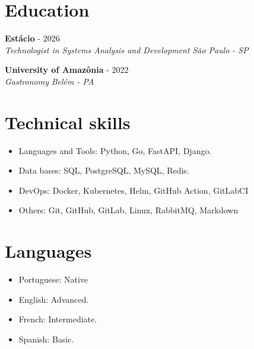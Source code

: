\documentclass[a4paper,10pt]{article}
\newcommand{\entry}[4]{
  \noindent\textbf{#1} \hfill #2 \\
  \noindent\textit{#3} \hfill \textit{#4} \\
  \vspace{2pt}
}
\begin{document}

\section*{Education}
\vspace{0.6em}

\entry{Estácio}{\faCalendar {} - 2026}{Technologist in Systems Analysis and Development}{\faMapMarker \space São Paulo - SP}

\entry{University of Amazônia}{\faCalendar {} - 2022}{Gastronomy}{\faMapMarker \space Belém - PA}


\section*{Technical skills}
\vspace{0.6em}
\begin{itemize}
\setlength\itemsep{0em}
\item Languages and Tools: Python, Go, FastAPI, Django.
\item Data bases: SQL, PostgreSQL, MySQL, Redis.
\item DevOps: Docker, Kubernetes, Helm, GitHub Action, GitLabCI
\item Others: Git, GitHub, GitLab, Linux, RabbitMQ, Markdown
\end{itemize}

\section*{Languages}
\vspace{0.6em}
\begin{itemize}
\setlength\itemsep{0em}
\item Portuguese: Native
\item English: Advanced.
\item French: Intermediate.
\item Spanish: Basic.
\end{itemize}
\end{document}
